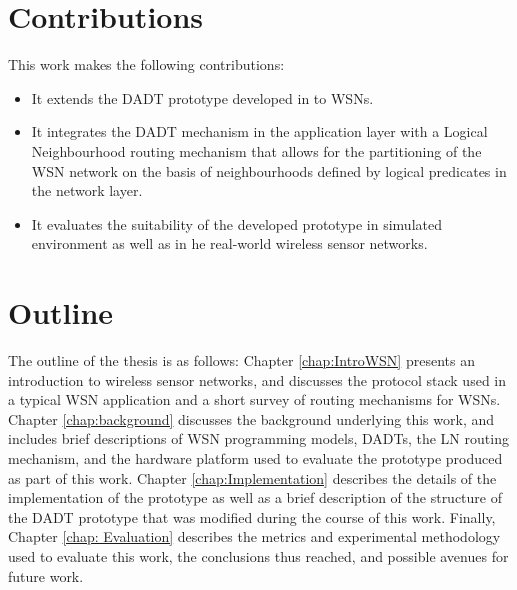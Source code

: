 \section{Contributions}

This work makes the following contributions:

\begin{itemize}
\item It extends the DADT prototype developed in \cite{migliavacca_DADT:2006} to WSNs.
\item It integrates the DADT mechanism in the application layer with a Logical
Neighbourhood \cite{mottola_LNAbstraction} routing mechanism that allows for
the partitioning of the WSN network on the basis of neighbourhoods defined by logical predicates in the network layer.
\item It evaluates the suitability of the developed prototype in simulated
environment as well as in he real-world wireless sensor networks.
\end{itemize}

\section{Outline}
The outline of the thesis is as follows: Chapter \ref{chap:IntroWSN} presents an
introduction to wireless sensor networks, and discusses the protocol stack used
in a typical WSN application and a short survey of routing mechanisms for WSNs.
Chapter \ref{chap:background} discusses the background underlying this work, and
includes brief descriptions of WSN programming models, DADTs, the LN routing mechanism,
and the hardware platform used to evaluate the prototype produced as part of this
work. Chapter \ref{chap:Implementation} describes the details of the
implementation of the prototype as well as a brief description of the structure of the DADT prototype
that was modified during the course of this work. Finally, Chapter \ref{chap:
Evaluation} describes the metrics and experimental methodology used to evaluate this work, the
conclusions thus reached, and possible avenues for future work.








